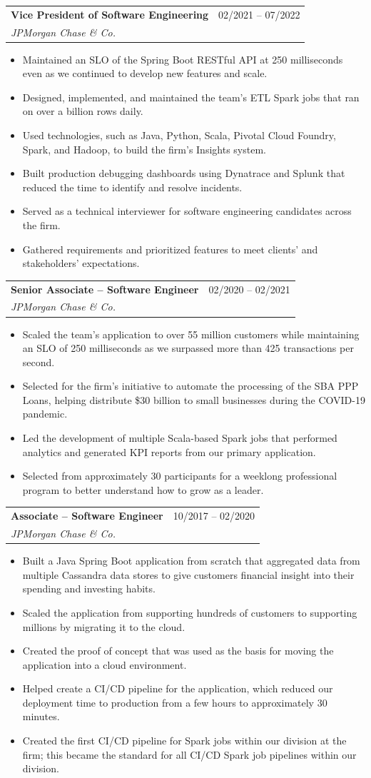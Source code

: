 \documentclass[letterpaper,10pt]{article}
\makeatletter
\newcommand{\resumeItem}[1]{
  \item\small{#1 \vspace{-1pt}}
}
\newcommand{\resumeSubheading}[4]{
  \vspace{-1pt}\item
    \begin{tabular*}{0.97\textwidth}[t]{l@{\extracolsep{\fill}}r}
      \textbf{#1} & #2 \\
      \textit{\small#3} & \textit{\small #4} \\
    \end{tabular*}\vspace{-4pt}
}
\newcommand{\resumeItemListStart}{\begin{itemize}[leftmargin=*, itemsep=2pt, topsep=3pt, parsep=0pt, partopsep=0pt]}
\newcommand{\resumeItemListEnd}{\end{itemize}\vspace{-2pt}}
\makeatother
\begin{document}
    \resumeSubheading
      {Vice President of Software Engineering}{02/2021 -- 07/2022}
      {JPMorgan Chase \& Co.}{}
      \resumeItemListStart
        \resumeItem{Maintained an SLO of the Spring Boot RESTful API at 250 milliseconds even as we continued to develop new features and scale.}
        \resumeItem{Designed, implemented, and maintained the team's ETL Spark jobs that ran on over a billion rows daily.}
        \resumeItem{Used technologies, such as Java, Python, Scala, Pivotal Cloud Foundry, Spark, and Hadoop, to build the firm's Insights system.}
        \resumeItem{Built production debugging dashboards using Dynatrace and Splunk that reduced the time to identify and resolve incidents.}
        \resumeItem{Served as a technical interviewer for software engineering candidates across the firm.}
        \resumeItem{Gathered requirements and prioritized features to meet clients' and stakeholders' expectations.}
    \resumeItemListEnd

    \resumeSubheading
      {Senior Associate -- Software Engineer}{02/2020 -- 02/2021}
      {JPMorgan Chase \& Co.}{}
      \resumeItemListStart
      \resumeItem{Scaled the team's application to over 55 million customers while maintaining an SLO of 250 milliseconds as we surpassed more than 425 transactions per second.}
        \resumeItem{Selected for the firm's initiative to automate the processing of the SBA PPP Loans, helping distribute \$30 billion to small businesses during the COVID-19 pandemic.}
        \resumeItem{Led the development of multiple Scala-based Spark jobs that performed analytics and generated KPI reports from our primary application.}
        \resumeItem{Selected from approximately 30 participants for a weeklong professional program to better understand how to grow as a leader.}
      \resumeItemListEnd

    \resumeSubheading
      {Associate -- Software Engineer}{10/2017 -- 02/2020}
      {JPMorgan Chase \& Co.}{}
      \resumeItemListStart
        \resumeItem{Built a Java Spring Boot application from scratch that aggregated data from multiple Cassandra data stores to give customers financial insight into their spending and investing habits.}
        \resumeItem{Scaled the application from supporting hundreds of customers to supporting millions by migrating it to the cloud.}
        \resumeItem{Created the proof of concept that was used as the basis for moving the application into a cloud environment.}
        \resumeItem{Helped create a CI/CD pipeline for the application, which reduced our deployment time to production from a few hours to approximately 30 minutes.}
        \resumeItem{Created the first CI/CD pipeline for Spark jobs within our division at the firm; this became the standard for all CI/CD Spark job pipelines within our division.}
      \resumeItemListEnd
\end{document}
